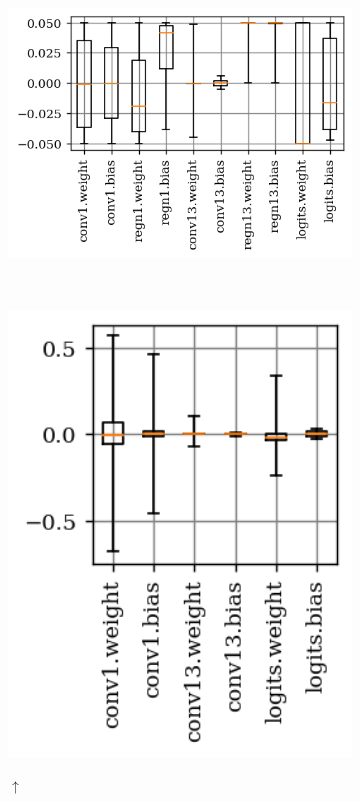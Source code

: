 \begin{figure}[t]
\begin{subfigure}{0.35\textwidth}
		\includegraphics[width=1\textwidth]{c10_weights_q8005auunrfp_nt.png}
	\end{subfigure}
	\\
	\begin{subfigure}{0.16\textwidth}
		\vspace*{0px}
		\centering
		\Quant
		\includegraphics[width=1\textwidth]{c10_weights_q81auunrfp_nt_fixedgn.png}
	\end{subfigure}
	\begin{subfigure}{0.16\textwidth}
		\vspace*{0px}
		\centering
		\Clipping[$0.25$] $\uparrow$
			

\end{subfigure}
\end{figure}
